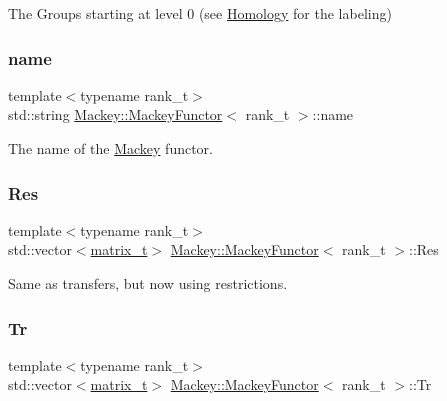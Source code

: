 The Groups starting at level 0 (see \hyperlink{classMackey_1_1Homology}{Homology} for the labeling) 

\mbox{\label{classMackey_1_1MackeyFunctor_ae1d69a215249d8b1018ac810ecc63d56}} 
\subsubsection{\texorpdfstring{name}{name}}
{\footnotesize\ttfamily template$<$typename rank\+\_\+t$>$ \\
std\+::string \hyperlink{classMackey_1_1MackeyFunctor}{Mackey\+::\+Mackey\+Functor}$<$ rank\+\_\+t $>$\+::name}



The name of the \hyperlink{namespaceMackey}{Mackey} functor. 

\mbox{\label{classMackey_1_1MackeyFunctor_a2a659b146972121a5d180c8c38909780}} 
\subsubsection{\texorpdfstring{Res}{Res}}
{\footnotesize\ttfamily template$<$typename rank\+\_\+t$>$ \\
std\+::vector$<$\hyperlink{classMackey_1_1MackeyFunctor_a271550bc911da5c842bbc90d8bf87973}{matrix\+\_\+t}$>$ \hyperlink{classMackey_1_1MackeyFunctor}{Mackey\+::\+Mackey\+Functor}$<$ rank\+\_\+t $>$\+::Res}



Same as transfers, but now using restrictions. 

\mbox{\label{classMackey_1_1MackeyFunctor_ae695013be3025f6841326e2ca0d03754}} 
\subsubsection{\texorpdfstring{Tr}{Tr}}
{\footnotesize\ttfamily template$<$typename rank\+\_\+t$>$ \\
std\+::vector$<$\hyperlink{classMackey_1_1MackeyFunctor_a271550bc911da5c842bbc90d8bf87973}{matrix\+\_\+t}$>$ \hyperlink{classMackey_1_1MackeyFunctor}{Mackey\+::\+Mackey\+Functor}$<$ rank\+\_\+t $>$\+::Tr}



